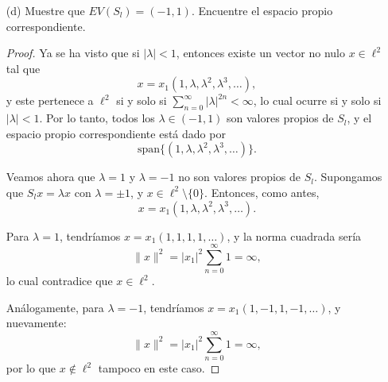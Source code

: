 \begin{enumerate}
\begin{proof}
Ahora bien, para que \( x \in \ell^2 \), debe cumplirse que
\begin{align*}
\sum_{n=1}^{\infty} |x_n|^2 
&= \sum_{n=1}^{\infty} |x_1 \lambda^{n-1}|^2 
= |x_1|^2 \sum_{n=0}^{\infty} |\lambda|^{2n}.
\end{align*}

La serie geométrica \( \sum_{n=0}^{\infty} |\lambda|^{2n} \) converge si y solo si \( |\lambda| < 1 \). Por lo tanto, para que \( x \in \ell^2 \), se debe tener \( |\lambda| < 1 \).

Esto muestra que si \( |\lambda| < 1 \), entonces \( \lambda \) es valor propio de \( S_l \), y así
\[
A := \{ \lambda \in \mathbb{R} : |\lambda| < 1 \} \subseteq \sigma(S_l).
\]

Como \( \sigma(S_l) \) es un conjunto cerrado en \( \mathbb{R} \) , se sigue que
\[
\overline{A} \subseteq \sigma(S_l) \subseteq \{ \lambda \in \mathbb{R} : |\lambda| \leq 1 \}.
\]

Pero \( \overline{A} = \{ \lambda \in \mathbb{R} : |\lambda| \leq 1 \} \), así que se concluye
\[
\sigma(S_l) = \{ \lambda \in \mathbb{R} : |\lambda| \leq 1 \}.
\]

    \end{proof}
    \item[(d)] Muestre que \( EV(S_{l}) = (-1, 1) \). Encuentre el espacio propio correspondiente.
   
\begin{proof}
Ya se ha visto que si \( |\lambda| < 1 \), entonces existe un vector no nulo \( x \in \ell^2 \) tal que
\[
x = x_1(1, \lambda, \lambda^2, \lambda^3, \dots),
\]
y este pertenece a \( \ell^2 \) si y solo si \( \sum_{n=0}^\infty |\lambda|^{2n} < \infty \), lo cual ocurre si y solo si \( |\lambda| < 1 \). Por lo tanto, todos los \( \lambda \in (-1,1) \) son valores propios de \( S_l \), y el espacio propio correspondiente está dado por
\[
\text{span}\{(1, \lambda, \lambda^2, \lambda^3, \ldots)\}.
\]

Veamos ahora que \( \lambda = 1 \) y \( \lambda = -1 \) no son valores propios de \( S_l \). Supongamos que \( S_l x = \lambda x \) con \( \lambda = \pm 1 \), y \( x \in \ell^2 \setminus \{0\} \). Entonces, como antes,
\[
x = x_1 (1, \lambda, \lambda^2, \lambda^3, \ldots).
\]

Para \( \lambda = 1 \), tendríamos \( x = x_1 (1,1,1,1,\dots) \), y la norma cuadrada sería
\[
\|x\|^2 = |x_1|^2 \sum_{n=0}^{\infty} 1 = \infty,
\]
lo cual contradice que \( x \in \ell^2 \).

Análogamente, para \( \lambda = -1 \), tendríamos \( x = x_1(1, -1, 1, -1, \dots) \), y nuevamente:
\[
\|x\|^2 = |x_1|^2 \sum_{n=0}^{\infty} 1 = \infty,
\]
por lo que \( x \notin \ell^2 \) tampoco en este caso.


\end{proof}
\end{enumerate}
